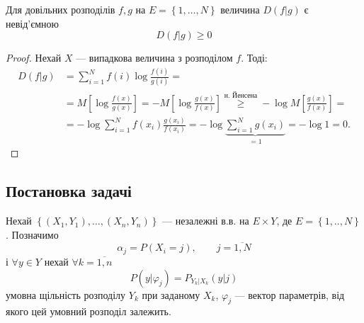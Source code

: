 
\begin{lemma}
  Для довільних розподілів $f, g$ на $E = \left\{ 1, \ldots, N \right\}$
  величина $D(f|g)$ є невід'ємною
  \[ D(f|g) \geq 0 \]
\end{lemma}
\begin{proof}
  Нехай $X$ --- випадкова величина з розподілом $f$. Тоді:
  \begin{align*}
    D(f|g) &= \sum_{i=1}^{N} f(i) \log \frac{f(i)}{g(i)} = \\ 
           &= M \left[ \log \frac{f(x)}{g(x)} \right] = 
    -M \left[ \log \frac{g(x)}{f(x)} \right] \overset{\text{н. Йенсена}}{\geq}
    - \log M \left[ \frac{g(x)}{f(x)} \right] = \\
           &= - \log \sum_{i=1}^{N} f(x_i) \frac{g\left( x_i \right) }{f(x_i)} = 
    -\log \underbrace{\sum_{i=1}^{N} g(x_i)}_{=1} = -\log 1 = 0
  .\end{align*}
\end{proof}



\subsection{Постановка задачі}

Нехай $\left\{ (X_1, Y_1) ,\ldots,\left( X_n, Y_n \right)  \right\} $ --- незалежні в.в.
на $E \times Y$, де $E = \left\{ 1, .., N \right\} $. Позначимо
\[ \alpha_j = P(X_i = j) , \qquad j = \overline{1, N} \] 
і $\forall y \in Y$ нехай $\forall k = \overline{1, n}$ 
\[ P\left( y | \varphi_j \right)  = P_{Y_k | X_k}\left( y | j \right) \]
умовна щільність розподілу $Y_k$ при заданому $X_k$,
$\varphi_j$ --- вектор параметрів, від якого цей умовний
розподіл залежить.


